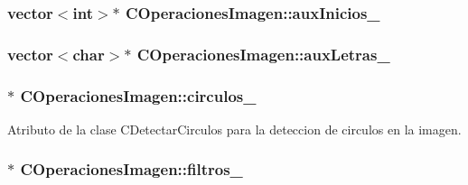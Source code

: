 \subsubsection[{\texorpdfstring{aux\+Inicios\+\_\+}{auxInicios_}}]{\setlength{\rightskip}{0pt plus 5cm}vector$<$int$>$$\ast$ C\+Operaciones\+Imagen\+::aux\+Inicios\+\_\+\hspace{0.3cm}{\ttfamily [private]}}\hypertarget{classCOperacionesImagen_af0f1f09f1b470be97924d72b81e7e5de}{}\label{classCOperacionesImagen_af0f1f09f1b470be97924d72b81e7e5de}
\subsubsection[{\texorpdfstring{aux\+Letras\+\_\+}{auxLetras_}}]{\setlength{\rightskip}{0pt plus 5cm}vector$<$char$>$$\ast$ C\+Operaciones\+Imagen\+::aux\+Letras\+\_\+\hspace{0.3cm}{\ttfamily [private]}}\hypertarget{classCOperacionesImagen_a984f9ea55b09b5e12564c6d29130394e}{}\label{classCOperacionesImagen_a984f9ea55b09b5e12564c6d29130394e}
\subsubsection[{\texorpdfstring{circulos\+\_\+}{circulos_}}]{$\ast$ C\+Operaciones\+Imagen\+::circulos\+\_\+\hspace{0.3cm}{\ttfamily [private]}}\hypertarget{classCOperacionesImagen_a385572b456e0aeaa055392daecf325d6}{}\label{classCOperacionesImagen_a385572b456e0aeaa055392daecf325d6}


Atributo de la clase C\+Detectar\+Circulos para la deteccion de circulos en la imagen. 

\subsubsection[{\texorpdfstring{filtros\+\_\+}{filtros_}}]{$\ast$ C\+Operaciones\+Imagen\+::filtros\+\_\+\hspace{0.3cm}{\ttfamily [private]}}\hypertarget{classCOperacionesImagen_aa27657bee56e9afe2a64937e15c15d46}{}\label{classCOperacionesImagen_aa27657bee56e9afe2a64937e15c15d46}



